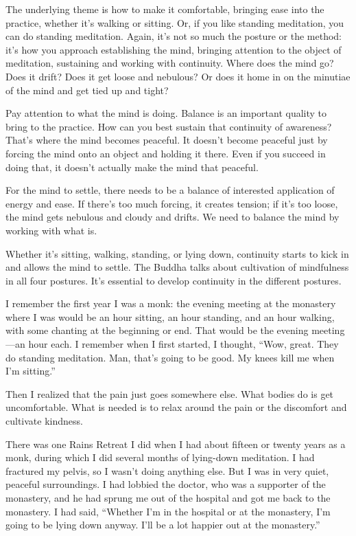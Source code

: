 The underlying theme is how to make it comfortable, bringing ease into
the practice, whether it’s walking or sitting. Or, if you like standing
meditation, you can do standing meditation. Again, it’s not so much the
posture or the method: it’s how you approach establishing the mind,
bringing attention to the object of meditation, sustaining and working
with continuity. Where does the mind go? Does it drift? Does it get
loose and nebulous? Or does it home in on the minutiae of the mind and
get tied up and tight?

Pay attention to what the mind is doing. Balance is an important quality
to bring to the practice. How can you best sustain that continuity of
awareness? That’s where the mind becomes peaceful. It doesn’t become
peaceful just by forcing the mind onto an object and holding it there.
Even if you succeed in doing that, it doesn’t actually make the mind
that peaceful.

For the mind to settle, there needs to be a balance of interested
application of energy and ease. If there’s too much forcing, it creates
tension; if it’s too loose, the mind gets nebulous and cloudy and
drifts. We need to balance the mind by working with what is.

Whether it’s sitting, walking, standing, or lying down, continuity
starts to kick in and allows the mind to settle. The Buddha talks about
cultivation of mindfulness in all four postures. It’s essential to
develop continuity in the different postures.

I remember the first year I was a monk: the evening meeting at the
monastery where I was would be an hour sitting, an hour standing, and an
hour walking, with some chanting at the beginning or end. That would be
the evening meeting—an hour each. I remember when I first started, I
thought, “Wow, great. They do standing meditation. Man, that’s going to
be good. My knees kill me when I’m sitting.”

Then I realized that the pain just goes somewhere else. What bodies do
is get uncomfortable. What is needed is to relax around the pain or the
discomfort and cultivate kindness.

There was one Rains Retreat I did when I had about fifteen or twenty
years as a monk, during which I did several months of lying-down
meditation. I had fractured my pelvis, so I wasn’t doing anything else.
But I was in very quiet, peaceful surroundings. I had lobbied the
doctor, who was a supporter of the monastery, and he had sprung me out
of the hospital and got me back to the monastery. I had said, “Whether
I’m in the hospital or at the monastery, I’m going to be lying down
anyway. I’ll be a lot happier out at the monastery.”


